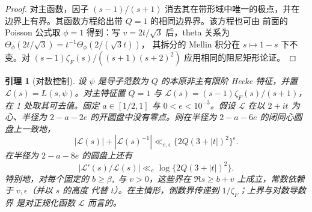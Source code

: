 \documentclass[11pt,a4paper]{article}
\numberwithin{equation}{section}
\numberwithin{figure}{section}
\newtheorem{lemma}[theorem]{引理}
\theoremstyle{definition}
\theoremstyle{remark}
\begin{document}
\begin{proof}
对主函数，因子 $(s-1)/(s+1)$ 消去其在带形域中唯一的极点，并在
边界上有界。其函数方程给出带 $Q=1$ 的相同边界界。该方程也可由
前面的 Poisson 公式取 $\phi=1$ 得到：写 $v=2t/\sqrt3$ 后，theta
关系为 $\Theta_\phi(2t/\sqrt3)=t^{-1}\Theta_\phi(2/(\sqrt3t))$，
其拆分的 Mellin 积分在 $s\mapsto1-s$ 下不变。对
$(s-1)\zeta_F(s)/((s+1)(s+2)^2)$ 应用相同的阻尼矩形论证。
\end{proof}

\begin{lemma}[对数控制]\label{lem:logarithmic-control}
设 $\psi$ 是导子范数为 $Q$ 的本原非主有限阶 Hecke 特征，并置
$\mathcal L(s)=L(s,\psi)$。对主特征置 $Q=1$ 与
$\mathcal L(s)=(s-1)\zeta_F(s)/(s+1)$，在 1 处取其可去值。固定
$a\in[1/2,1]$ 与 $0<e<10^{-3}$。假设 $\mathcal L$ 在以 $2+it$
为心、半径为 $2-a-2e$ 的开圆盘中没有零点。则在半径为
$2-a-6e$ 的闭同心圆盘上一致地，
\begin{equation}\label{eq:disk-control}
 |\mathcal L(s)|+|\mathcal L(s)^{-1}|
 \ll_{e,\epsilon}\{2Q(3+|t|)^2\}^{\epsilon}.
\end{equation}
在半径为 $2-a-8e$ 的圆盘上还有
\[
 |\mathcal L'(s)/\mathcal L(s)|\ll_e\log\{2Q(3+|t|)^2\}.
\]
特别地，对每个固定的 $b\ge\beta_*$ 与 $v>0$，这些界在
$\Re s\ge b+v$ 上成立，常数依赖于 $v,\epsilon$（并以 $s$ 的高度
代替 $t$）。在主情形，倒数界传递到 $1/\zeta_F$；上界与对数导数界
是对正规化函数 $\mathcal L$ 而言的。
\end{lemma}
\end{document}
